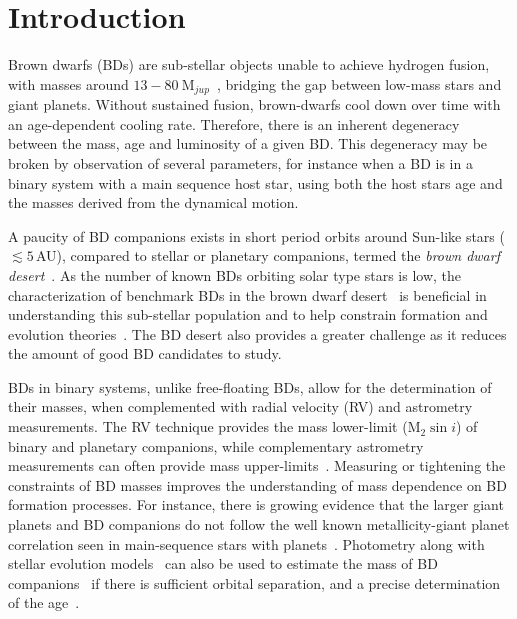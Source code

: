 \documentclass[fleqn,usenatbib]{mnras}
\begin{document}


\section{Introduction}
\label{sec:intro}
Brown dwarfs (BDs) are sub-stellar objects unable to achieve hydrogen fusion, with masses around \(13-80~\textrm{M}_{jup} \)~\citep{chabrier_theory_2000}, bridging the gap between low-mass stars and giant planets. Without sustained fusion, brown-dwarfs cool down over time with an age-dependent cooling rate. Therefore, there is an inherent degeneracy between the mass, age and luminosity of a given BD\citep{burrows_nongray_1997}. This degeneracy may be broken by observation of several parameters, for instance when a BD is in a binary system with a main sequence host star, using both the host stars age and the masses derived from the dynamical motion.

A paucity of BD companions exists in short period orbits around Sun-like stars (\(\lesssim5 \)\,AU), compared to stellar or planetary companions, termed the \emph{brown dwarf desert}~\citep{halbwachs_exploring_2000,zucker_analysis_2001,sahlmann_search_2011}. As the number of known BDs orbiting solar type stars is low, the characterization of benchmark BDs in the brown dwarf desert~\citep[e.g.][]{crepp_trends_2016} is beneficial in understanding this sub-stellar population and to help constrain formation and evolution theories~\citep{whitworth_formation_2007}. The BD desert also provides a greater challenge as it reduces the amount of good BD candidates to study.

BDs in binary systems, unlike free-floating BDs, allow for the determination of their masses, when complemented with radial velocity (RV) and astrometry measurements. The RV technique provides the mass lower-limit (\(\textrm{M}_{2}\sin{i} \)) of binary and planetary companions, while complementary astrometry measurements can often provide mass upper-limits~\citep[e.g.][]{sahlmann_search_2011}. Measuring or tightening the constraints of BD masses improves the understanding of mass dependence on BD formation processes. For instance, there is growing evidence that the larger giant planets and BD companions do not follow the well known metallicity-giant planet correlation seen in main-sequence stars with planets~\citep[e.g.][]{santos_spectroscopic_2004,santos_observational_2017, maldonado_searching_2017}. Photometry along with stellar evolution models~\citep[e.g.][]{baraffe_evolutionary_2003,allard_btsettl_2013} can also be used to estimate the mass of BD companions~\citep[e.g.][]{moutou_eccentricity_2017} if there is sufficient orbital separation, and a precise determination of the age~\citep{soderblom_ages_2010}. 
\end{document}
